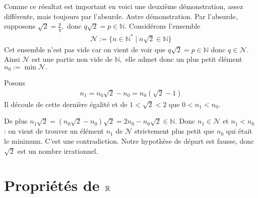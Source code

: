\documentclass[letterpaper,10pt,french]{jupyterBook}
\begin{document}
\sphinxAtStartPar
Comme ce résultat est important en voici une deuxième démonstration, assez différente, mais toujours par l’absurde.
Autre démonstration. Par l’absurde, supposons \(\sqrt{2}=\frac{p}{q},\) donc \(q\sqrt{2}=p\in \mathbb{N}.\) Considérons l’ensemble
\begin{equation*}
\begin{split}
\mathcal{N}:=\{n\in \mathbb{N}^{*}\mid n\sqrt{2}\in \mathbb{N}\}
\end{split}
\end{equation*}
\sphinxAtStartPar
Cet ensemble n’est pas vide car on vient de voir que \(q\sqrt{2}=p\in \mathbb{N}\) donc \(q\in \mathcal{N}.\) Ainsi \(\mathcal{N}\) est une partie non vide de \(\mathbb{N},\)
elle admet donc un plus petit élément \(n_0 :=\min \mathcal{N}.\)

\sphinxAtStartPar
Posons
\begin{equation*}
\begin{split}
n_1=n_0 \sqrt{2}-n_0=n_0 (\sqrt{2}-1)
\end{split}
\end{equation*}
\sphinxAtStartPar
Il découle de cette dernière égalité et de \(1 <\sqrt{2} < 2\) que \(0 < n_1 < n_0.\)

\sphinxAtStartPar
De plus \(n_1 \sqrt{2}= (n_0 \sqrt{2}-n_0
)\sqrt{2}= 2n_0-n_0 \sqrt{2}\in \mathbb{N}.\) Donc \(n_1\in \mathcal{N}\) et \(n_1 < n_0\)
: on vient de trouver un élément \(n_1\) de
\(\mathcal{N}\) strictement plus petit que \(n_0\) qui était le minimum. C’est une contradiction.
Notre hypothèse de départ est fausse, donc \(\sqrt{2}\) est un nombre irrationnel.


\section{Propriétés de \protect\(\mathbb{R}\protect\)}
\label{\detokenize{proprties:proprietes-de-mathbb-r}}\label{\detokenize{proprties::doc}}
\end{document}
